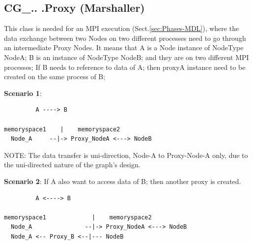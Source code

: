 \subsection{CG\_.. .Proxy (Marshaller)}
\label{sec:CG_xxxProxy}
\label{sec:Proxy-MGS-handling}
\label{sec:Marshaller}
\label{sec:DeMarshaller}

This class is needed for an MPI execution (Sect.\ref{sec:Phases-MDL}), where the
data exchange between two Nodes on two different processes need to go through an
intermediate Proxy Nodes. It means that A is a Node instance of NodeType NodeA;
B is an instance of NodeType NodeB; and they are on two different MPI processes;
If B needs to reference to data of A; then proxyA instance need to be created on
the same process of B;

{\bf Scenario 1}:
\begin{verbatim}
         A ----> B

memoryspace1    |    memoryspace2
  Node_A     --|-> Proxy_NodeA <---> NodeB
\end{verbatim}
NOTE: The data transfer is uni-direction, Node-A to Proxy-Node-A only, due to
the uni-directed nature of the graph's design. 


{\bf Scenario 2}: If A also want to access data of B; then another proxy is
created.
\begin{verbatim}
         A <----> B

memoryspace1             |    memoryspace2
  Node_A               --|-> Proxy_NodeA <---> NodeB
  Node_A <-- Proxy_B <--|--- NodeB
\end{verbatim}

